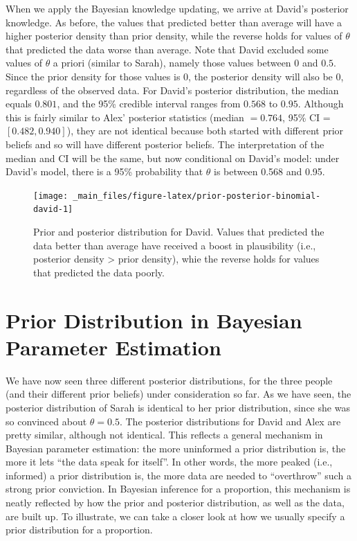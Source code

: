 \documentclass[
]{book}
\begin{document}
When we apply the Bayesian knowledge updating, we arrive at David's posterior knowledge. As before, the values that predicted better than average will have a higher posterior density than prior density, while the reverse holds for values of \(\theta\) that predicted the data worse than average. Note that David excluded some values of \(\theta\) a priori (similar to Sarah), namely those values between 0 and \(0.5\). Since the prior density for those values is 0, the posterior density will also be 0, regardless of the observed data. For David's posterior distribution, the median equals \(0.801\), and the 95\% credible interval ranges from \(0.568\) to \(0.95\). Although this is fairly similar to Alex' posterior statistics (median \(=0.764\), 95\% CI = \([0.482, 0.940]\)), they are not identical because both started with different prior beliefs and so will have different posterior beliefs. The interpretation of the median and CI will be the same, but now conditional on David's model: under David's model, there is a 95\% probability that \(\theta\) is between 0.568 and 0.95.

\begin{figure}

{\centering \texttt{[image: \_main\_files/figure-latex/prior-posterior-binomial-david-1]} 

}

\caption{Prior and posterior distribution for David. Values that predicted the data better than average have received a boost in plausibility (i.e., posterior density > prior density), whie the reverse holds for values that predicted the data poorly.}\label{fig:prior-posterior-binomial-david}
\end{figure}

\hypertarget{prior-distribution-in-bayesian-parameter-estimation}{%
\section{Prior Distribution in Bayesian Parameter Estimation}\label{prior-distribution-in-bayesian-parameter-estimation}}

We have now seen three different posterior distributions, for the three people (and their different prior beliefs) under consideration so far. As we have seen, the posterior distribution of Sarah is identical to her prior distribution, since she was so convinced about \(\theta = 0.5\). The posterior distributions for David and Alex are pretty similar, although not identical. This reflects a general mechanism in Bayesian parameter estimation: the more uninformed a prior distribution is, the more it lets ``the data speak for itself''. In other words, the more peaked (i.e., informed) a prior distribution is, the more data are needed to ``overthrow'' such a strong prior conviction.
In Bayesian inference for a proportion, this mechanism is neatly reflected by how the prior and posterior distribution, as well as the data, are built up. To illustrate, we can take a closer look at how we usually specify a prior distribution for a proportion.
\end{document}
